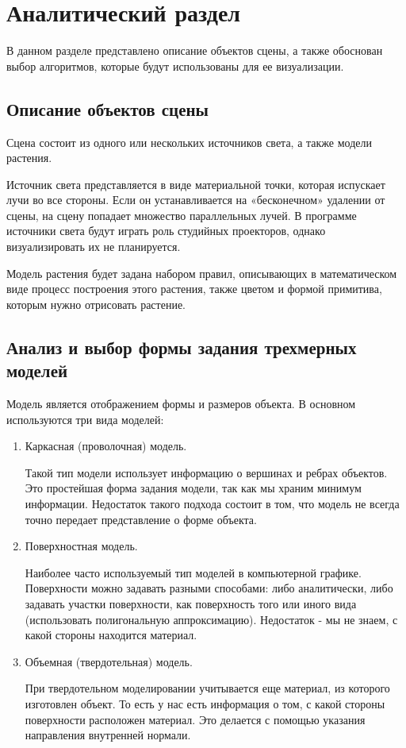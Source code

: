 \chapter{Аналитический раздел}
В данном разделе представлено описание объектов сцены, а также обоснован выбор алгоритмов, которые будут использованы для ее визуализации. 

\section{Описание объектов сцены}

Сцена состоит из одного или нескольких источников света, а также модели растения.

Источник света представляется в виде материальной точки, которая испускает лучи во все стороны. Если он устанавливается на «бесконечном» удалении от сцены, на сцену попадает множество параллельных лучей. В
программе источники света будут играть роль студийных проекторов, однако визуализировать их не планируется.

Модель растения будет задана набором правил, описывающих в математическом виде процесс построения этого растения, также цветом и формой примитива, которым нужно отрисовать растение.

\section{Анализ и выбор формы задания трехмерных моделей}
Модель является отображением формы и размеров объекта. 
В основном используются три вида моделей:

\begin{enumerate}
	\item Каркасная (проволочная) модель.
	
    Такой тип модели использует информацию о вершинах и ребрах объектов. Это простейшая форма задания модели, так как мы храним минимум информации. Недостаток такого подхода состоит в том, что модель не всегда точно передает представление о форме объекта.
	\newpage
	\item Поверхностная модель.
	
	Наиболее часто используемый тип моделей в компьютерной графике. Поверхности можно задавать разными способами: либо аналитически, либо задавать участки поверхности, как поверхность того или иного вида (использовать полигональную аппроксимацию). Недостаток - мы не знаем, с какой стороны находится материал. 
	
	\item  Объемная (твердотельная) модель.
	
	При твердотельном моделировании учитывается еще материал, из которого изготовлен объект. То есть у нас есть информация о том, с какой стороны поверхности расположен материал. Это делается с помощью указания направления внутренней нормали.

\end{enumerate}

